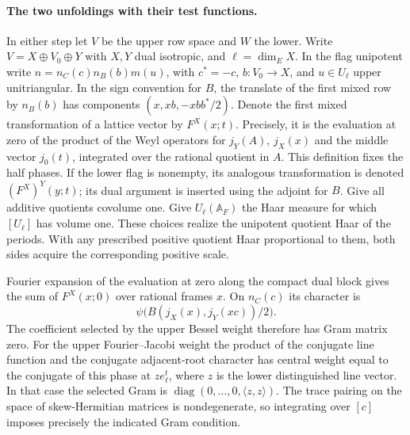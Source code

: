 \paragraph{The two unfoldings with their test functions.}
In either step let \(V\) be the upper row space and \(W\) the
lower. Write \(V=X\oplus V_0\oplus Y\) with \(X,Y\)
dual isotropic, and \(\ell=\dim_E X\). In the flag unipotent
write \(n=n_C(c)n_B(b)m(u)\), with \(c^*=-c\),
\(b\colon V_0\to X\), and \(u\in U_\ell\) upper
unitriangular. In the sign convention for \(B\), the translate of
the first mixed row by \(n_B(b)\) has components
\((x,xb,-xbb^*/2)\). Denote the first mixed transformation of a
lattice vector by \(F^X(x;t)\). Precisely, it is the evaluation
at zero of the product of the Weyl operators for \(j_Y(A)\),
\(j_X(x)\) and the middle vector \(j_0(t)\), integrated over
the rational quotient in \(A\). This definition fixes the half
phases. If the lower flag is nonempty, its analogous transformation
is denoted \((F^X)^Y(y;t)\); its dual argument is inserted using
the adjoint for \(B\). Give all additive quotients covolume one.
Give \(U_\ell(\mathbb A_F)\) the Haar measure for which
\([U_\ell]\) has volume one. These choices realize the
unipotent quotient Haar of the periods. With any prescribed
positive quotient Haar proportional to them, both sides acquire
the corresponding positive scale.

Fourier expansion of the evaluation at zero along the compact
dual block gives the sum of \(F^X(x;0)\) over rational frames
\(x\). On \(n_C(c)\) its character is
\[
 \psi\bigl(B(j_X(x),j_Y(xc))/2\bigr).
\]
The coefficient selected by the upper Bessel weight therefore has
Gram matrix zero. For the upper Fourier--Jacobi weight the product
of the conjugate line function and the conjugate adjacent-root
character has central weight equal to the conjugate of this phase
at \(z e_\ell^t\), where \(z\) is the lower distinguished
line vector. In that case the selected Gram is
\(\operatorname{diag}(0,\ldots,0,\langle z,z\rangle)\).
The trace pairing on the space of skew-Hermitian matrices is
nondegenerate, so integrating over \([c]\) imposes precisely the
indicated Gram condition.

